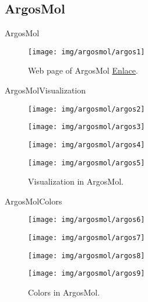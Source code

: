 \documentclass[10pt]{beamer}
\newcommand{\chref}[2]{\href{#1}{{\usebeamercolor[bg]{Feather}#2}}}
\newcommand{\chref}[3][blue]{\href{#2}{\color{#1}{#3}}}%
\newcommand{\1}{
        	\setbeamertemplate{background}{
        		\texttt{[image: img/1]}
        		\tikz[overlay] \fill[fill opacity=0.75,fill=white] (0,0) rectangle (-\paperwidth,\paperheight);
        	}
}
\begin{document}
\subsection{ArgosMol}

\begin{frame}{ArgosMol}{}	
	\begin{figure}
		\centering
		\texttt{[image: img/argosmol/argos1]}
		\caption{Web page of ArgosMol \chref{http://134.209.44.160/argosmol/protein_interaction.php}{Enlace}.}
	\end{figure}
\end{frame}

\begin{frame}{ArgosMol}{Visualization}	
	\begin{figure}[h]
		\centering
		\begin{multicols}{2}
			\texttt{[image: img/argosmol/argos2]}\par 
			\texttt{[image: img/argosmol/argos3]}\par 
			\texttt{[image: img/argosmol/argos4]}\par 
			\texttt{[image: img/argosmol/argos5]}\par 
		\end{multicols}
		\caption{Visualization in ArgosMol.}
		\label{fig:protein_1}
	\end{figure}
\end{frame}


\begin{frame}{ArgosMol}{Colors}	
	\begin{figure}[h]
		\centering
		\begin{multicols}{2}
			\texttt{[image: img/argosmol/argos6]}\par 
			\texttt{[image: img/argosmol/argos7]}\par 
			\texttt{[image: img/argosmol/argos8]}\par 
			\texttt{[image: img/argosmol/argos9]}\par 
		\end{multicols}
		\caption{Colors in ArgosMol.}
		\label{fig:protein_1}
	\end{figure}
\end{frame}
\end{document}
